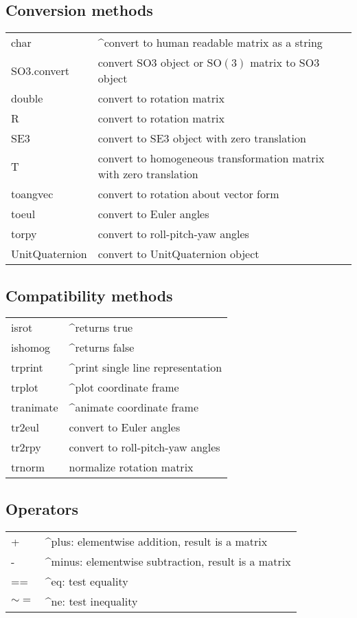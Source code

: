 \subsection*{Conversion methods}
\begin{longtable}{lp{120mm}}
char & \textasciicircum convert to human readable matrix as a string\\ 
SO3.convert & convert SO3 object or $\mbox{SO}(3)$ matrix to SO3 object\\ 
double & convert to rotation matrix\\ 
R & convert to rotation matrix\\ 
SE3 & convert to SE3 object with zero translation\\ 
T & convert to homogeneous transformation matrix with zero translation\\ 
toangvec & convert to rotation about vector form\\ 
toeul & convert to Euler angles\\ 
torpy & convert to roll-pitch-yaw angles\\ 
UnitQuaternion & convert to UnitQuaternion object\\ 
\end{longtable}\vspace{1ex}

\subsection*{Compatibility methods}
\begin{longtable}{lp{120mm}}
isrot & \textasciicircum returns true\\ 
ishomog & \textasciicircum returns false\\ 
trprint & \textasciicircum print single line representation\\ 
trplot & \textasciicircum plot coordinate frame\\ 
tranimate & \textasciicircum animate coordinate frame\\ 
tr2eul & convert to Euler angles\\ 
tr2rpy & convert to roll-pitch-yaw angles\\ 
trnorm & normalize rotation matrix\\ 
\end{longtable}\vspace{1ex}

\subsection*{Operators}
\begin{longtable}{lp{120mm}}
+ & \textasciicircum plus: elementwise addition, result is a matrix\\ 
- & \textasciicircum minus: elementwise subtraction, result is a matrix\\ 
== & \textasciicircum eq: test equality\\ 
$\sim=$ & \textasciicircum ne: test inequality\\ 
\end{longtable}\vspace{1ex}


